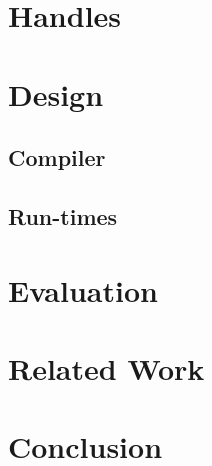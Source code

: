 \documentclass[sigplan,screen]{acmart}
\begin{document}
\section{Handles}
\lipsum[2-4]

\section{Design}
\lipsum[2-4]
\subsection{Compiler}
\lipsum[2-4]
\subsection{Run-times}
\lipsum[2-4]

\section{Evaluation}
\lipsum[2-4]

\section{Related Work}
\lipsum[1-2]

\section{Conclusion}
\lipsum[1-2]
 
\end{document}
